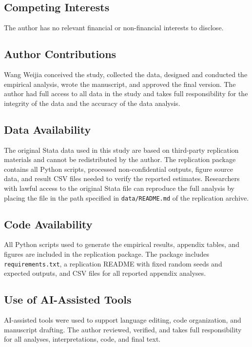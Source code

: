 \documentclass[12pt]{article}
\begin{document}
\subsection*{Competing Interests}
The author has no relevant financial or non-financial interests to disclose.

\subsection*{Author Contributions}
Wang Weijia conceived the study, collected the data, designed and conducted
the empirical analysis, wrote the manuscript, and approved the final version.
The author had full access to all data in the study and takes full
responsibility for the integrity of the data and the accuracy of the data
analysis.

\subsection*{Data Availability}
The original Stata data used in this study are based on third-party
replication materials and cannot be redistributed by the author.  The
replication package contains all Python scripts, processed non-confidential
outputs, figure source data, and result CSV files needed to verify the
reported estimates.  Researchers with lawful access to the original Stata
file can reproduce the full analysis by placing the file in the path
specified in \texttt{data/README.md} of the replication archive.

\subsection*{Code Availability}
All Python scripts used to generate the empirical results, appendix tables,
and figures are included in the replication package.  The package includes
\texttt{requirements.txt}, a replication README with fixed random seeds and
expected outputs, and CSV files for all reported appendix analyses.

\subsection*{Use of AI-Assisted Tools}
AI-assisted tools were used to support language editing, code organization,
and manuscript drafting.  The author reviewed, verified, and takes full
responsibility for all analyses, interpretations, code, and final text.

\newpage


\end{document}
